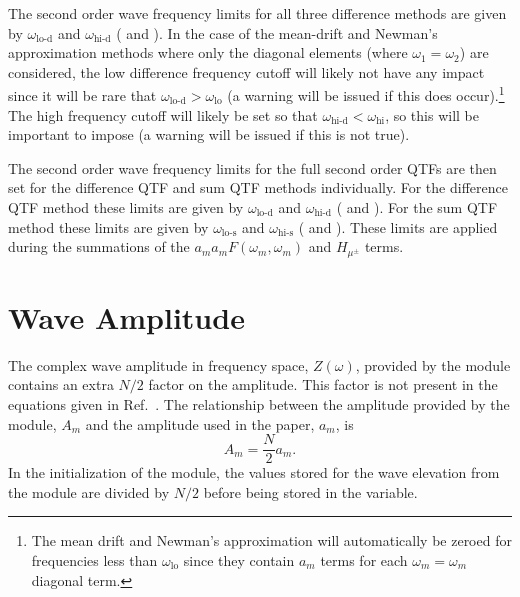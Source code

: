 The second order wave frequency limits for all three difference methods are given by $\omega_\text{lo-d}$ and $\omega_\text{hi-d}$ ( and ).
In the case of the mean-drift and Newman's approximation methods where only the diagonal elements (where $\omega_1 = \omega_2$) are considered, the low difference frequency cutoff will likely not have any impact since it will be rare that $\omega_\text{lo-d} > \omega_\text{lo}$ (a warning will be issued if this does occur).\footnote{The mean drift and Newman's approximation will automatically be zeroed for frequencies less than $\omega_\text{lo}$ since they contain $a_m$ terms for each $\omega_m = \omega_m$ diagonal term.}  The high frequency cutoff will likely be set so that $\omega_\text{hi-d} < \omega_\text{hi}$, so this will be important to impose (a warning will be issued if this is not true).


The second order wave frequency limits for the full second order QTFs are then set for the difference QTF and sum QTF methods individually.
For the difference QTF method these limits are given by  $\omega_\text{lo-d}$ and $\omega_\text{hi-d}$ ( and ).
For the sum QTF method these limits are given by  $\omega_\text{lo-s}$ and $\omega_\text{hi-s}$ ( and ).
These limits are applied during the summations of the $a_m a_m F(\omega_m,\omega_m)$ and $H_{\mu^\pm}$ terms.




\section{Wave Amplitude}
\label{sec:2ndOrdCalc:WaveAmp}

The complex wave amplitude in frequency space, $Z(\omega)$, provided by the  module contains an extra $N/2$ factor on the amplitude.  This factor is not present in the equations given in Ref.~.  
The relationship between the amplitude provided by the  module, $A_m$ and the amplitude used in the paper, $a_m$, is
\begin{equation}
   A_m = \frac{N}{2} a_m.
\label{eq:WaveAmp}
\end{equation}
In the initialization of the  module, the values stored for the wave elevation from the  module are divided by $N/2$ before being stored in the  variable.




